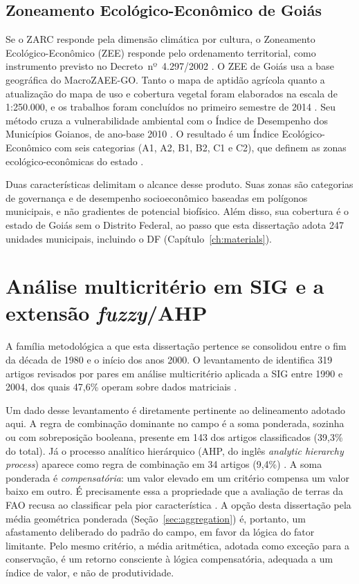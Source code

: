 \subsection{Zoneamento Ecológico-Econômico de Goiás}\label{sec:sota-zee}

Se o ZARC responde pela dimensão climática por cultura, o Zoneamento Ecológico-Econômico (ZEE) responde
pelo ordenamento territorial, como instrumento previsto no Decreto~nº~4.297/2002
\citep[p.~2320]{queiroz_o_2022}. O ZEE de Goiás usa a base geográfica do MacroZAEE-GO. Tanto o mapa de
aptidão agrícola quanto a atualização do mapa de uso e cobertura vegetal foram elaborados na escala de
1:250.000, e os trabalhos foram concluídos no primeiro semestre de 2014
\citep[p.~2323]{queiroz_o_2022}. Seu método cruza a vulnerabilidade ambiental com o Índice de
Desempenho dos Municípios Goianos, de ano-base 2010 \citep[p.~2327]{queiroz_o_2022}. O resultado é um
Índice Ecológico-Econômico com seis categorias (A1, A2, B1, B2, C1 e C2), que definem as zonas
ecológico-econômicas do estado \citep[Quadro~1, p.~2328]{queiroz_o_2022}.

Duas características delimitam o alcance desse produto. Suas zonas são categorias de governança e de
desempenho socioeconômico baseadas em polígonos municipais, e não gradientes de potencial biofísico.
Além disso, sua cobertura é o estado de Goiás sem o Distrito Federal, ao passo que esta dissertação
adota 247 unidades municipais, incluindo o DF (Capítulo~\ref{ch:materials}).

\section{Análise multicritério em SIG e a extensão \emph{fuzzy}/AHP}\label{sec:sota-mcda}

A família metodológica a que esta dissertação pertence se consolidou entre o fim da década de 1980 e o
início dos anos 2000. O levantamento de \citet[p.~704]{malczewski_gisbased_2006} identifica 319 artigos
revisados por pares em análise multicritério aplicada a SIG entre 1990 e 2004, dos quais 47,6\% operam
sobre dados matriciais \citep[p.~707]{malczewski_gisbased_2006}.

Um dado desse levantamento é diretamente pertinente ao delineamento adotado aqui. A regra de combinação
dominante no campo é a soma ponderada, sozinha ou com sobreposição booleana, presente em 143 dos
artigos classificados (39,3\% do total). Já o processo analítico hierárquico (AHP, do inglês
\emph{analytic hierarchy process}) aparece como regra de combinação em 34 artigos (9,4\%)
\citep[Tabela~4, p.~710]{malczewski_gisbased_2006}. A soma ponderada é \emph{compensatória}: um valor
elevado em um critério compensa um valor baixo em outro. É precisamente essa a propriedade que a
avaliação de terras da FAO recusa ao classificar pela pior característica \citep[p.~62]{sys_land_1991}.
A opção desta dissertação pela média geométrica ponderada (Seção~\ref{sec:aggregation}) é, portanto, um
afastamento deliberado do padrão do campo, em favor da lógica do fator limitante. Pelo mesmo critério,
a média aritmética, adotada como exceção para a conservação, é um retorno consciente à lógica
compensatória, adequada a um índice de valor, e não de produtividade.

